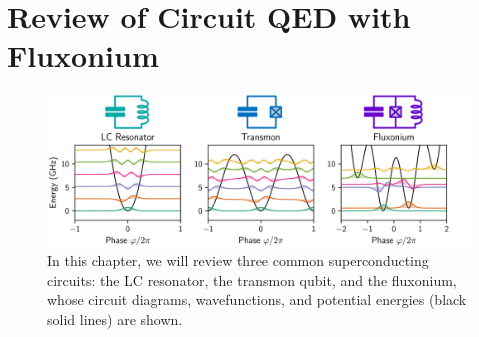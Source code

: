 \chapter{Review of Circuit QED with Fluxonium\label{ch:3_cQED}}


\begin{figure}[h]
    \centering
    \includegraphics[width=\linewidth]{Figures/3/Circuit_QED_Overview.pdf}
    \caption{In this chapter, we will review three common superconducting circuits: the LC resonator, the transmon qubit, and the fluxonium, whose circuit diagrams, wavefunctions, and potential energies (black solid lines) are shown.}
    \label{fig:3_Circuit_QED_Overview}
\end{figure}